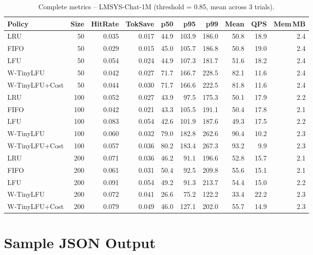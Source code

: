 \documentclass[11pt,a4paper]{article}
\begin{document}
\begin{table}[H]
\centering
\caption{Complete metrics -- LMSYS-Chat-1M (threshold = 0.85, mean across 3 trials).}
\label{tab:full_lmsys085}
\scriptsize
\setlength{\tabcolsep}{3pt}
\begin{tabular}{@{} l r rrrr rr rr @{}}
\toprule
\textbf{Policy} & \textbf{Size} & \textbf{HitRate} & \textbf{TokSave} & \textbf{p50} & \textbf{p95} & \textbf{p99} & \textbf{Mean} & \textbf{QPS} & \textbf{Mem\,MB} \\
\midrule
LRU              & 50  & 0.035 & 0.017 & 44.9 & 103.9 & 186.0 & 50.8 & 18.9 & 2.4 \\
FIFO             & 50  & 0.029 & 0.015 & 45.0 & 105.7 & 186.8 & 50.8 & 19.0 & 2.4 \\
LFU              & 50  & 0.054 & 0.024 & 44.9 & 107.3 & 181.7 & 51.6 & 18.2 & 2.4 \\
W-TinyLFU        & 50  & 0.042 & 0.027 & 71.7 & 166.7 & 228.5 & 82.1 & 11.6 & 2.4 \\
W-TinyLFU+Cost   & 50  & 0.044 & 0.030 & 71.7 & 166.6 & 222.5 & 81.8 & 11.6 & 2.4 \\
\midrule
LRU              & 100 & 0.052 & 0.027 & 43.9 & 97.5  & 175.3 & 50.1 & 17.9 & 2.2 \\
FIFO             & 100 & 0.042 & 0.021 & 43.3 & 105.5 & 191.1 & 50.4 & 17.8 & 2.1 \\
LFU              & 100 & 0.083 & 0.054 & 42.6 & 101.9 & 187.6 & 49.3 & 17.5 & 2.2 \\
W-TinyLFU        & 100 & 0.060 & 0.032 & 79.0 & 182.8 & 262.6 & 90.4 & 10.2 & 2.3 \\
W-TinyLFU+Cost   & 100 & 0.057 & 0.036 & 80.2 & 183.4 & 267.3 & 93.2 & 9.9  & 2.3 \\
\midrule
LRU              & 200 & 0.071 & 0.036 & 46.2 & 91.1  & 196.6 & 52.8 & 15.7 & 2.1 \\
FIFO             & 200 & 0.061 & 0.031 & 50.4 & 92.5  & 209.8 & 55.6 & 15.1 & 2.1 \\
LFU              & 200 & 0.091 & 0.054 & 49.2 & 91.3  & 213.7 & 54.4 & 15.0 & 2.2 \\
W-TinyLFU        & 200 & 0.072 & 0.041 & 26.6 & 75.2  & 122.2 & 33.4 & 22.2 & 2.3 \\
W-TinyLFU+Cost   & 200 & 0.079 & 0.049 & 46.0 & 127.1 & 202.0 & 55.7 & 14.9 & 2.3 \\
\bottomrule
\end{tabular}
\end{table}

\section{Sample JSON Output}
\end{document}
